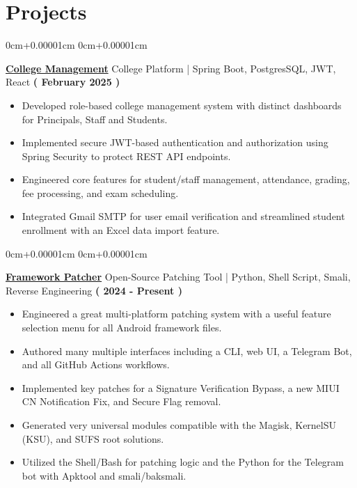 \documentclass[10pt,a4paper]{article}
\newenvironment{highlights}{
    \begin{itemize}[
        topsep=0.10cm,
        parsep=0.10cm,
        partopsep=0pt,
        itemsep=0pt,
        leftmargin=10pt,
    ]
    }{
    \end{itemize}
}
\newenvironment{onecolentry}{
    \begin{adjustwidth}{
        0cm+0.00001cm
    }{
        0cm+0.00001cm
    }
    }{
    \end{adjustwidth}
}
\begin{document}
    \section{Projects}\label{sec:projects}
    \begin{onecolentry}
        \textbf{\href{https://github.com/jefino9488/college-management-server}{College Management}} College Platform | Spring Boot, PostgresSQL, JWT, React \hfill \textbf{( February 2025 )} \\
        \begin{highlights}
            \item Developed role-based college management system with distinct dashboards for Principals, Staff and Students. \\
            \item Implemented secure JWT-based authentication and authorization using Spring Security to protect REST API endpoints. \\
            \item Engineered core features for student/staff management, attendance, grading, fee processing, and exam scheduling. \\
            \item Integrated Gmail SMTP for user email verification and streamlined student enrollment with an Excel data import feature. \\
        \end{highlights}
    \end{onecolentry}
    \vspace{0.1cm}
    \begin{onecolentry}
        \textbf{\href{https://github.com/Jefino9488/FrameworkPatcherV2}{Framework Patcher}} Open-Source Patching Tool | Python, Shell Script, Smali, Reverse Engineering \hfill \textbf{( 2024 - Present )} \\
        \begin{highlights}
            \item Engineered a great multi-platform patching system with a useful feature selection menu for all Android framework files.
            \item Authored many multiple interfaces including a CLI, web UI, a Telegram Bot, and all GitHub Actions workflows.
            \item Implemented key patches for a Signature Verification Bypass, a new MIUI CN Notification Fix, and Secure Flag removal.
            \item Generated very universal modules compatible with the Magisk, KernelSU (KSU), and SUFS root solutions.
            \item Utilized the Shell/Bash for patching logic and the Python for the Telegram bot with Apktool and smali/baksmali.
        \end{highlights}
    \end{onecolentry}
\end{document}
